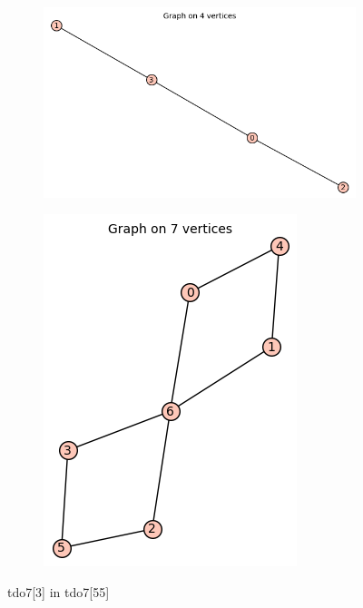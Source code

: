 \documentclass[12pt, a4paper]{article}
\begin{document}
\begin{center}
\begin{figure}[!htb]
\centering
\begin{subfigure}{0.5\textwidth}
  \centering
  \includegraphics[width=0.45\linewidth]{tdo7[3]}
\end{subfigure}%
\begin{subfigure}{0.5\textwidth}
  \centering
  \includegraphics[width=0.35\linewidth]{tdo7[55]}
\end{subfigure}
\caption{tdo7[3] in tdo7[55]}
\label{fig:test}
\end{figure}


\end{center}
\end{document}
